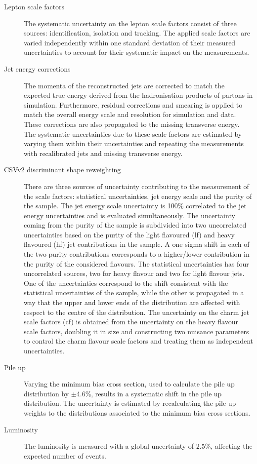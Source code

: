 \begin{description}
  		\item[Lepton scale factors] The systematic uncertainty on the lepton scale factors consist of three sources: identification, isolation and tracking.	The applied scale factors are varied independently within one standard deviation of their measured uncertainties to account for their systematic impact on the measurements. 

	\item[Jet energy corrections] The momenta of the reconstructed jets are corrected to match the expected true energy derived from the hadronisation products of partons in simulation. Furthermore, residual corrections and smearing is applied to match the overall energy scale and resolution for simulation and data. These corrections are also propagated to the missing transverse energy. The systematic uncertainties due to these scale factors are estimated by varying them within their uncertainties and repeating the measurements with recalibrated jets and missing transverse energy. 
	

	
	\item[CSVv2 discriminant shape reweighting] There are three sources of uncertainty contributing to the measurement of the scale factors: statistical uncertainties, jet energy scale and the purity of the sample. The jet energy scale uncertainty is 100\% correlated to the jet energy uncertainties and is evaluated simultaneously. The uncertainty coming from the purity of the sample is subdivided into two uncorrelated uncertainties based on the purity of the light flavoured (lf) and heavy flavoured (hf) jet contributions in the sample. A one sigma shift in each of the two purity contributions corresponds to a higher/lower contribution in the purity of the considered flavours. The statistical uncertainties has four uncorrelated sources, two for heavy flavour and two for light flavour jets. One of the uncertainties correspond to the shift consistent with the statistical uncertainties of the sample, while the other is propagated in a way that the upper and lower ends of the distribution are affected with respect to the centre of the distribution.   The uncertainty on the charm jet scale factors (cf)   is obtained from the uncertainty on the heavy flavour scale factors, doubling it in size and constructing two nuisance parameters to control the charm flavour scale factors and treating them as independent uncertainties. 
	
	
		\item[Pile up] Varying the minimum bias cross section, used to calculate the pile up distribution by $\pm$4.6\%, results in a systematic shift in the pile up distribution. The uncertainty is estimated by  recalculating the pile up weights to the distributions associated to the minimum bias cross sections. 
		
		
		\item[Luminosity] The luminosity  is measured with a global uncertainty of 2.5\%, affecting the expected number of events. 
	
\end{description}

